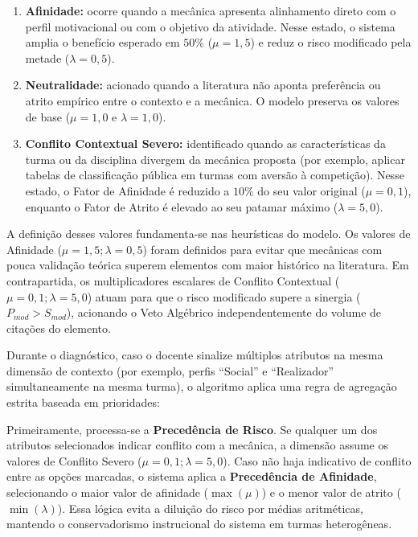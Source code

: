 \begin{enumerate}
    \item \textbf{Afinidade:} ocorre quando a mecânica apresenta alinhamento direto com o perfil motivacional ou com o objetivo da atividade. Nesse estado, o sistema amplia o benefício esperado em $50\%$ ($\mu = 1,5$) e reduz o risco modificado pela metade ($\lambda = 0,5$).
    \item \textbf{Neutralidade:} acionado quando a literatura não aponta preferência ou atrito empírico entre o contexto e a mecânica. O modelo preserva os valores de base ($\mu = 1,0$ e $\lambda = 1,0$).
    \item \textbf{Conflito Contextual Severo:} identificado quando as características da turma ou da disciplina divergem da mecânica proposta (por exemplo, aplicar tabelas de classificação pública em turmas com aversão à competição). Nesse estado, o Fator de Afinidade é reduzido a $10\%$ do seu valor original ($\mu = 0,1$), enquanto o Fator de Atrito é elevado ao seu patamar máximo ($\lambda = 5,0$).
\end{enumerate}

A definição desses valores fundamenta-se nas heurísticas do modelo. Os valores de Afinidade ($\mu = 1,5; \lambda = 0,5$) foram definidos para evitar que mecânicas com pouca validação teórica superem elementos com maior histórico na literatura. Em contrapartida, os multiplicadores escalares de Conflito Contextual ($\mu = 0,1; \lambda = 5,0$) atuam para que o risco modificado supere a sinergia ($P_{mod} > S_{mod}$), acionando o Veto Algébrico independentemente do volume de citações do elemento.

Durante o diagnóstico, caso o docente sinalize múltiplos atributos na mesma dimensão de contexto (por exemplo, perfis ``Social'' e ``Realizador'' simultaneamente na mesma turma), o algoritmo aplica uma regra de agregação estrita baseada em prioridades:

Primeiramente, processa-se a \textbf{Precedência de Risco}. Se qualquer um dos atributos selecionados indicar conflito com a mecânica, a dimensão assume os valores de Conflito Severo ($\mu = 0,1; \lambda = 5,0$). Caso não haja indicativo de conflito entre as opções marcadas, o sistema aplica a \textbf{Precedência de Afinidade}, selecionando o maior valor de afinidade ($\max(\mu)$) e o menor valor de atrito ($\min(\lambda)$). Essa lógica evita a diluição do risco por médias aritméticas, mantendo o conservadorismo instrucional do sistema em turmas heterogêneas.

